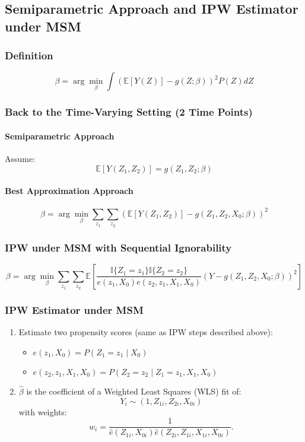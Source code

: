 \subsection*{Semiparametric Approach and IPW Estimator under MSM}

\subsubsection*{Definition}
\[
\beta = \arg\min_\beta \int \left(\mathbb{E}[Y(Z)] - g(Z; \beta)\right)^2 P(Z) dZ
\]

\subsubsection*{Back to the Time-Varying Setting (2 Time Points)}
\paragraph*{Semiparametric Approach}
Assume:
\[
\mathbb{E}[Y(Z_1, Z_2)] = g(Z_1, Z_2; \beta)
\]

\paragraph*{Best Approximation Approach}
\[
\beta = \arg\min_\beta \sum_{z_1} \sum_{z_2} \left(\mathbb{E}[Y(Z_1, Z_2)] - g(Z_1, Z_2, X_0; \beta)\right)^2
\]

\subsubsection*{IPW under MSM with Sequential Ignorability}
\[
\beta = \arg\min_\beta \sum_{z_1} \sum_{z_2} \mathbb{E} \left[\frac{\mathbb{I}\{Z_1 = z_1\} \mathbb{I}\{Z_2 = z_2\}}{e(z_1, X_0) e(z_2, z_1, X_1, X_0)} \left(Y - g(Z_1, Z_2, X_0; \beta)\right)^2 \right]
\]

\subsubsection*{IPW Estimator under MSM}
\begin{enumerate}
    \item Estimate two propensity scores (same as IPW steps described above):
    \begin{itemize}
        \item $e(z_1, X_0) = P(Z_1 = z_1 \mid X_0)$
        \item $e(z_2, z_1, X_1, X_0) = P(Z_2 = z_2 \mid Z_1 = z_1, X_1, X_0)$
    \end{itemize}
    \item $\hat{\beta}$ is the coefficient of a Weighted Least Squares (WLS) fit of:
    \[
    Y_i \sim (1, Z_{1i}, Z_{2i}, X_{0i})
    \]
    with weights:
    \[
    w_i = \frac{1}{\hat{e}(Z_{1i}, X_{0i}) \hat{e}(Z_{2i}, Z_{1i}, X_{1i}, X_{0i})}.
    \]
\end{enumerate}


